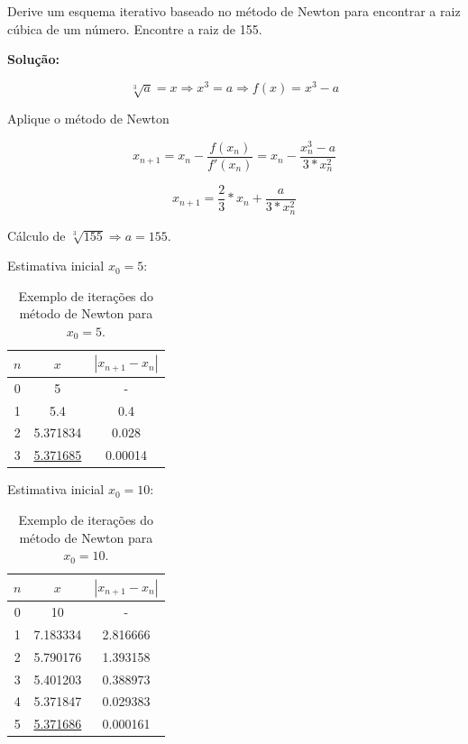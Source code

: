 \begin{example}
 Derive um esquema iterativo baseado no método de Newton para encontrar a raiz cúbica de um número. Encontre a raiz de 155.

 \textbf{Solução:}

\[
\sqrt[3]{a} = x \Rightarrow x^{3} = a \Rightarrow f(x) = x^{3} - a
\]
 
Aplique o método de Newton

\[
 x_{n+1} = x_{n} - \frac{f(x_{n})}{f'(x_{n})} = x_{n} - \frac{x_{n}^{3} - a}{3 \ast x_{n}^{2}}
\]

\[
 x_{n+1} = \frac{2}{3} \ast x_{n} + \frac{a}{3 \ast x_{n}^{2}}
\]

Cálculo de $\sqrt[3]{155} \Rightarrow a = 155$.

\begin{enumerar}
\item Estimativa inicial $x_{0} = 5$:

\begin{table}[htp]
\footnotesize
	\centering
		
		\begin{tabular}{|c|c|c|}
		\hline		
		\textbf{$n$} & \textbf{$x$} & \textbf{$\displaystyle | x_{n+1} - x_{n} |$}\\
		\hline \hline 
		0 & 5 & -\\
		\hline 
		1 & 5.4 & 0.4\\
		\hline 
		2 & 5.371834 & 0.028\\
		\hline 
		3 & \underline{5.371685} & 0.00014\\
		\hline
		\end{tabular}
	\caption{Exemplo de iterações do método de Newton para $x_{0} = 5$.}
	\label{tab:newton1}
\end{table}

\item Estimativa inicial $x_{0} = 10$:

\begin{table}[htp]
\footnotesize
	\centering
		
		\begin{tabular}{|c|c|c|}
		\hline		
		\textbf{$n$} & \textbf{$x$} & \textbf{$\displaystyle | x_{n+1} - x_{n} |$}\\
		\hline \hline 
		0 & 10 & -\\
		\hline 
		1 & 7.183334 & 2.816666\\
		\hline 
		2 & 5.790176 & 1.393158\\
		\hline
		3 & 5.401203 & 0.388973\\
		\hline
		4 & 5.371847 & 0.029383\\
		\hline
		5 & \underline{5.371686} & 0.000161\\
		\hline
		\end{tabular}
	\caption{Exemplo de iterações do método de Newton para $x_{0} = 10$.}
	\label{tab:newton2}
\end{table}

\end{enumerar}

\end{example}

